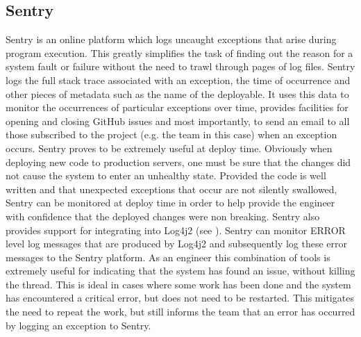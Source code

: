 \subsection{Sentry}
Sentry \cite{sentry} is an online platform which logs uncaught exceptions that arise during program execution. This greatly simplifies the task of finding out the reason for a system fault or failure without the need to trawl through pages of log files. Sentry logs the full stack trace associated with an exception, the time of occurrence and other pieces of metadata such as the name of the deployable. It uses this data to monitor the occurrences of particular exceptions over time, provides facilities for opening and closing GitHub issues and most importantly, to send an email to all those subscribed to the project (e.g. the \team{} team in this case) when an exception occurs. Sentry proves to be extremely useful at deploy time. Obviously when deploying new code to production servers, one must be sure that the changes did not cause the system to enter an unhealthy state. Provided the code is well written and that unexpected exceptions that occur are not silently swallowed, Sentry can be monitored at deploy time in order to help provide the engineer with confidence that the deployed changes were non breaking. Sentry also provides support for integrating into Log4j2 (see ). Sentry can monitor ERROR level log messages that are produced by Log4j2 and subsequently log these error messages to the Sentry platform. As an engineer this combination of tools is extremely useful for indicating that the system has found an issue, without killing the thread. This is ideal in cases where some work has been done and the system has encountered a critical error, but does not need to be restarted. This mitigates the need to repeat the work, but still informs the team that an error has occurred by logging an exception to Sentry.


